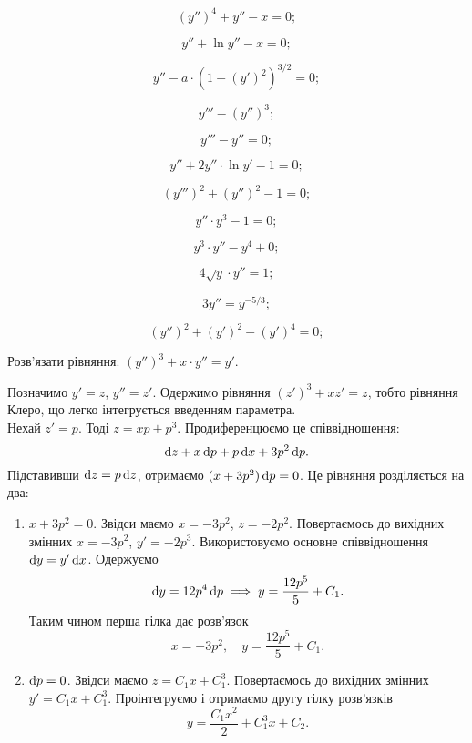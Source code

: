 \begin{multicols}{2}
\begin{problem}
	\[(y'')^4+y''-x=0;\]
\end{problem}
\begin{problem}
	\[y''+\ln y''-x=0;\]
\end{problem}
\begin{problem}
	\[y''-a\cdot(1+(y')^2)^{3/2}=0;\]
\end{problem}
\begin{problem}
	\[y'''-(y'')^3;\]
\end{problem}
\begin{problem}
	\[y'''-y''=0;\]
\end{problem}
\begin{problem}
	\[y''+2y''\cdot\ln y'-1=0;\]
\end{problem}
\begin{problem}
	\[(y''')^2+(y'')^2-1=0;\]
\end{problem}
\begin{problem}
	\[y''\cdot y^3-1=0;\]
\end{problem}
\begin{problem}
	\[y^3\cdot y''-y^4+0;\]
\end{problem}
\begin{problem}
	\[4\sqrt{y}\cdot y''=1;\]
\end{problem}
\begin{problem}
	\[3y''=y^{-5/3};\]
\end{problem}
\begin{problem}
	\[(y'')^2+(y')^2-(y')^4=0;\]
\end{problem}
\end{multicols}
\begin{example}
	Розв’язати рівняння: $(y'')^3 + x \cdot y'' = y'$.
\end{example}
\begin{solution}
	Позначимо $y'=z$, $y''=z'$. Одержимо рівняння $(z')^3+xz'=z$, тобто рівняння Клеро, що легко інтегрується введенням параметра. \\

	Нехай $z' = p$. Тоді $z=xp+p^3$. Продиференцюємо це співвідношення: \[\mathop{}\!\mathrm{d} z + x \mathop{}\!\mathrm{d} p + p \mathop{}\!\mathrm{d} x + 3 p^2 \mathop{}\!\mathrm{d} p.\] Підставивши $\mathop{}\!\mathrm{d} z = p \mathop{}\!\mathrm{d} z$, отримаємо $(x+3p^2)\mathop{}\!\mathrm{d} p = 0$. Це рівняння розділяється на два:
	\begin{enumerate}
		\item $x + 3p^2 = 0$. Звідси маємо $x = -3p^2$, $z=-2p^2$. Повертаємось до вихідних змінних $x=-3p^2$, $y'=-2p^3$. Використовуємо основне співвідношення $\mathop{}\!\mathrm{d} y = y' \mathop{}\!\mathrm{d} x$. Одержуємо \[ \mathop{}\!\mathrm{d} y = 12 p^4 \mathop{}\!\mathrm{d} p \implies y = \frac{12p^5}{5} + C_1.\] Таким чином перша гілка дає розв’язок \[ x = -3p^2, \quad y=\frac{12p^5}{5} + C_1.\]
		\item $\mathop{}\!\mathrm{d} p = 0$. Звідси маємо $z = C_1 x + C_1^3$. Повертаємось до вихідних змінних $y'=C_1x+C_1^3$. Проінтегруємо і отримаємо другу гілку розв’язків \[y=\frac{C_1x^2}{2}+C_1^3x+C_2.\]
	\end{enumerate}
\end{solution}
